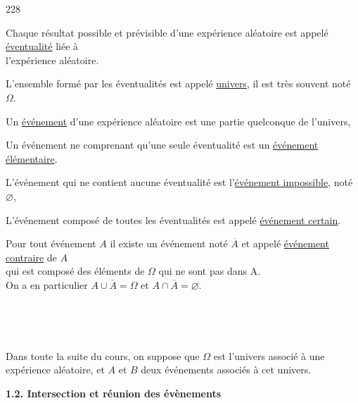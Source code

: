 \documentclass[11pt,a4paper]{article}
\newcommand{\cadre}[1]
{\begin{bclogo}[couleur = white,logo=,  arrondi = 0.1,barre=none]
~~
{%
\rule{0mm}{#1mm}}\par
\medskip
~~
\end{bclogo}}
\begin{document}
   \begin{dinglist}{228}
      \item Chaque résultat possible et prévisible d'une expérience aléatoire est appelé \underline{éventualité} liée à \\ \hspace*{0.3cm} l'expérience aléatoire.
      \item L'ensemble formé par les éventualités est appelé \underline{univers}, il est très souvent noté $\Omega$.
      \item Un \underline{événement} d'une expérience aléatoire est une partie quelconque de l'univers,
      \item Un événement ne comprenant qu'une seule éventualité est un \underline{événement élémentaire}.
      \item L'événement qui ne contient aucune éventualité est l'\underline{événement impossible}, noté $\varnothing$,
      \item L'événement composé de toutes les éventualités est appelé \underline{événement certain}.
      \item Pour tout événement $A$ il existe un événement noté $\overline{A}$ et appelé \underline{événement contraire} de $A$ \\ \hspace*{0.3cm} qui est composé des éléments de $\Omega$ qui ne sont pas dans A.\\
   \hspace*{0.3cm} On a en particulier $A\cup\overline{A}=\Omega$ et $A\cap\overline{A}=\varnothing$.
   \end{dinglist}


\smallskip
\cadre{70}

Dans toute la suite du cours, on suppose que $\Omega$ est l'univers associé à une expérience aléatoire, et $A$ et $B$ deux événements associés à cet univers.

\newpage 

\begin{mybox}
\begin{center}    
\textbf{1.2. Intersection et réunion des évènements }
\end{center}
\end{mybox}
\end{document}
